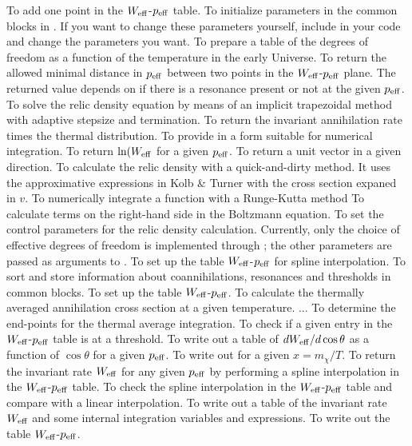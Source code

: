 \begin{brief-subs}
  To add one point in the $W_{\rm eff}$-$p_{\rm eff}$ table.
  To initialize parameters in the common blocks in . If
  you want to change these parameters yourself, include 
  in your code and change the parameters you want.
  To prepare a table of the degrees of freedom as a
  function of the temperature in the early Universe.
  To return the allowed minimal distance in $p_{\rm
  eff}$ between two points in the $W_{\rm eff}$-$p_{\rm eff}$ plane.
  The returned value depends on if there is a resonance present or not
  at the given $p_{\rm eff}$.
  To solve the relic density equation by means of an
  implicit trapezoidal method with adaptive stepsize and termination.
  To return the invariant annihilation rate times the
  thermal distribution.
  To provide  in a form suitable for
  numerical integration.
  To return $\ln(W_{\rm eff}$ for a given $p_{\rm
  eff}$.
  To return a unit vector in a given direction.
  To calculate the relic density with a
  quick-and-dirty method. It uses the approximative expressions in
  Kolb \& Turner with the cross section expaned in $v$.
  To numerically integrate a function with a
  Runge-Kutta method
  To calculate terms on the right-hand side in the
  Boltzmann equation.
  To set the control parameters for the relic density calculation. Currently, only the choice of effective degrees of freedom is implemented through ; the other parameters are passed as arguments to .
  To set up the table $W_{\rm eff}$-$p_{\rm eff}$ for
  spline interpolation.
  To sort and store information about coannihilations,
  resonances and thresholds in common blocks.
  To set up the table $W_{\rm eff}$-$p_{\rm eff}$.
  To calculate the thermally averaged annihilation
  cross section at a given temperature.
  ...
  To determine the end-points for the thermal
  average integration.
  To check if a given entry in the $W_{\rm
  eff}$-$p_{\rm eff}$ table is at a threshold.
  To write out a table of $dW_{\rm eff}/d\cos \theta$
  as a function of $\cos \theta$ for a given $p_{\rm eff}$.
  To write out  for a given $x=m_\chi/T$.
  To return the invariant rate $W_{\rm eff}$ for any
  given $p_{\rm eff}$ by performing a spline interpolation in the
  $W_{\rm eff}$-$p_{\rm eff}$ table.
  To check the spline interpolation in the $W_{\rm
  eff}$-$p_{\rm eff}$ table and compare with a linear interpolation.
  To write out a table of the invariant rate $W_{\rm
  eff}$ and some internal integration variables and expressions.
  To write out the table $W_{\rm eff}$-$p_{\rm eff}$.
\end{brief-subs}


